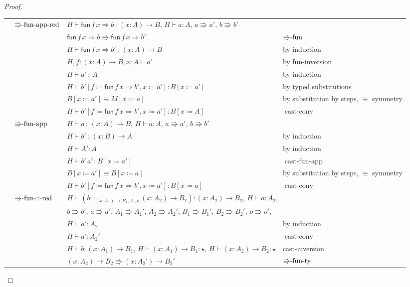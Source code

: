 \begin{proof}
\begin{tabular}{llll}
 & $\textrm{\ensuremath{\Rrightarrow}-fun-app-red}$ & \multicolumn{2}{l}{$H\vdash\mathsf{fun}\,f\,x\Rightarrow b\,:\,\left(x:A\right)\rightarrow B$,
$H\vdash a:A$, $a\Rrightarrow a'$, $b\Rrightarrow b'$}\tabularnewline
 &  & $\mathsf{fun}\,f\,x\Rightarrow b\Rrightarrow\mathsf{fun}\,f\,x\Rightarrow b'$ & $\textrm{\ensuremath{\Rrightarrow}-fun}$\tabularnewline
 &  & $H\vdash\mathsf{fun}\,f\,x\Rightarrow b'\,:\,\left(x:A\right)\rightarrow B$ & by induction\tabularnewline
 &  & $H,f:\left(x:A\right)\rightarrow B,x:A\vdash a'$ & by fun-inversion\tabularnewline
 &  & $H\vdash a'\,:\,A$ & by induction\tabularnewline
 &  & $H\vdash b'\left[f\coloneqq\mathsf{fun}\,f\,x\Rightarrow b',x\coloneqq a'\right]:B\left[x\coloneqq a'\right]$ & by typed substitutions\tabularnewline
 &  & $B\left[x\coloneqq a'\right]\equiv M\left[x\coloneqq a\right]$ & by substitution by steps, $\equiv$ symmetry\tabularnewline
 &  & $H\vdash b'\left[f\coloneqq\mathsf{fun}\,f\,x\Rightarrow b',x\coloneqq a'\right]:B\left[x\coloneqq A\right]$ & $\operatorname{cast-conv}$\tabularnewline
 & $\textrm{\ensuremath{\Rrightarrow}-fun-app}$ & $H\vdash a\,:\,\left(x:A\right)\rightarrow B$, $H\vdash a:A$, $a\Rrightarrow a'$,
$b\Rrightarrow b'$ & \tabularnewline
 &  & $H\vdash b'\,:\,\left(x:B\right)\rightarrow A$ & by induction\tabularnewline
 &  & $H\vdash A':A$ & by induction\tabularnewline
 &  & $H\vdash b'\,a':\,B\left[x\coloneqq a'\right]$ & $\operatorname{cast-fun-app}$\tabularnewline
 &  & $B\left[x\coloneqq a'\right]\equiv B\left[x\coloneqq a\right]$ & by substitution by steps, $\equiv$ symmetry\tabularnewline
 &  & $H\vdash b'\left[f\coloneqq\mathsf{fun}\,f\,x\Rightarrow b',x\coloneqq a'\right]:B\left[x\coloneqq a\right]$ & $\operatorname{cast-conv}$\tabularnewline
 & $\textrm{\ensuremath{\Rrightarrow}-fun-::-red}$ & \multicolumn{2}{l}{$H\vdash\left(b::_{\left(x:A_{1}\right)\rightarrow B_{1},\ensuremath{\ell},o}\left(x:A_{2}\right)\rightarrow B_{2}\right):\left(x:A_{2}\right)\rightarrow B_{2}$,
$H\vdash a:A_{2}$, }\tabularnewline
 &  & \multicolumn{2}{l}{$b\Rrightarrow b'$, $a\Rrightarrow a'$, $A_{1}\Rrightarrow A_{1}'$,
$A_{2}\Rrightarrow A_{2}'$, $B_{1}\Rrightarrow B_{1}'$, $B_{2}\Rrightarrow B_{2}'$,
$o\Rrightarrow o'$, }\tabularnewline
 &  & $H\vdash a':A_{2}$ & by induction\tabularnewline
 &  & $H\vdash a':A_{2}'$ & $\operatorname{cast-conv}$\tabularnewline
 &  & $H\vdash b:\left(x:A_{1}\right)\rightarrow B_{1}$, $H\vdash\left(x:A_{1}\right)\rightarrow B_{1}:\star$,
$H\vdash\left(x:A_{2}\right)\rightarrow B_{2}:\star$ & cast-inversion \tabularnewline
 &  & $\left(x:A_{2}\right)\rightarrow B_{2}\Rrightarrow\left(x:A_{2}'\right)\rightarrow B_{2}'$ & $\textrm{\ensuremath{\Rrightarrow}-fun-ty}$\tabularnewline

\end{tabular}
\end{proof}
